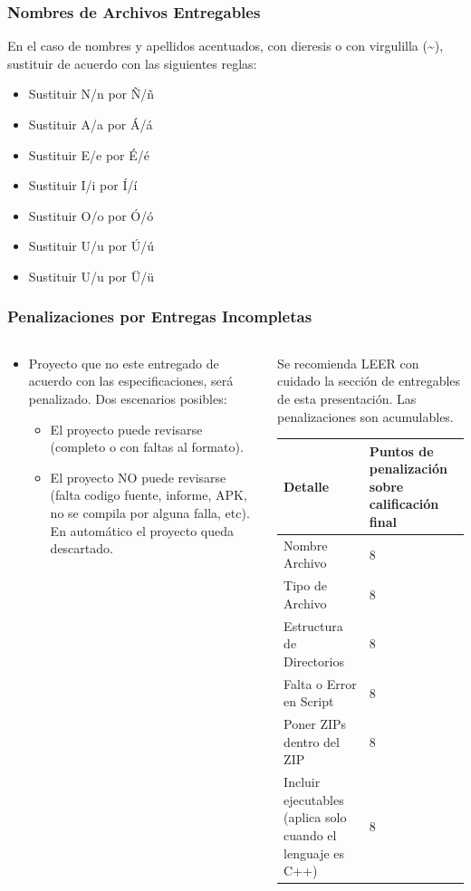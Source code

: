 \begin{frame}
\frametitle{Nombres de Archivos Entregables}
En el caso de nombres y apellidos acentuados, con dieresis o con virgulilla (\textasciitilde{}), sustituir de acuerdo con las siguientes reglas:
\begin{itemize}
\item Sustituir N/n por \~N/\~n
\item Sustituir A/a por \'A/\'a
\item Sustituir E/e por \'E/\'e
\item Sustituir I/i por \'I/\'i
\item Sustituir O/o por \'O/\'o
\item Sustituir U/u por \'U/\'u
\item Sustituir U/u por \"U/\"u
\end{itemize}
\end{frame}



\begin{frame}
\frametitle{Penalizaciones por Entregas Incompletas}
\begin{columns}
\begin{column}{0.4\textwidth}
\begin{itemize}
\item Proyecto que no este entregado de acuerdo con las especificaciones, ser\'a penalizado. Dos escenarios posibles:
\begin{itemize}
\item El proyecto puede revisarse (completo o con faltas al formato).
\item El proyecto NO puede revisarse (falta codigo fuente, informe, APK, no se compila por alguna falla, etc). En automático el proyecto queda descartado.
\end{itemize}
\end{itemize}
\end{column}
\begin{column}{0.6\textwidth}
Se recomienda LEER con cuidado la secci\'on de entregables de esta presentación. Las penalizaciones son acumulables. 
\small
\begin{tabular}{p{5cm}|p{2cm}}
\hline
\textbf{Detalle} & \textbf{Puntos de penalización sobre calificación final} \\
\hline
Nombre Archivo & 8 \\ \hline
Tipo de Archivo & 8 \\ \hline
Estructura de Directorios  & 8 \\ \hline
Falta o Error en Script  & 8 \\ \hline
Poner ZIPs dentro del ZIP  & 8 \\ \hline
Incluir ejecutables (aplica solo cuando el lenguaje es C++)  & 8 \\
\hline
\hline
\end{tabular}
\end{column}
\end{columns}
\end{frame}




